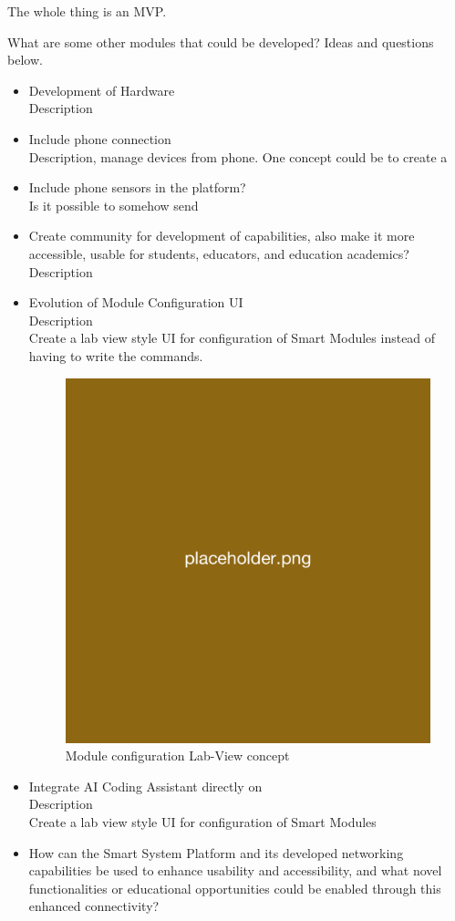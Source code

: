 The whole thing is an MVP.

What are some other modules that could be developed? Ideas and questions below.

\begin{itemize}
    \item Development of Hardware  \\
    Description \\
    \item Include phone connection \\
    Description, manage devices from phone. One concept could be to create a  \\
    \item Include phone sensors in the platform? \\
    Is it possible to somehow send \\
    \item Create community for development of capabilities, also make it more accessible, usable for students, educators, and education academics?  \\
    Description \\
    \item Evolution of Module Configuration UI  \\
    Description \\Create a lab view style UI for configuration of Smart Modules instead of having to write the commands. 
    \begin{figure}[H]
        \centering
        \includegraphics[width=0.5\linewidth]{overleaf/images/placeholder.png}
        \vspace{\ftspace}
        \caption{Module configuration Lab-View concept}
        \label{fig:labview_concept}
    \end{figure}
    \item Integrate AI Coding Assistant directly on   \\
    Description \\Create a lab view style UI for configuration of Smart Modules
    \item How can the Smart System Platform and its developed networking capabilities be used to enhance usability and accessibility, and what novel functionalities or educational opportunities could be enabled through this enhanced connectivity?
\end{itemize}


